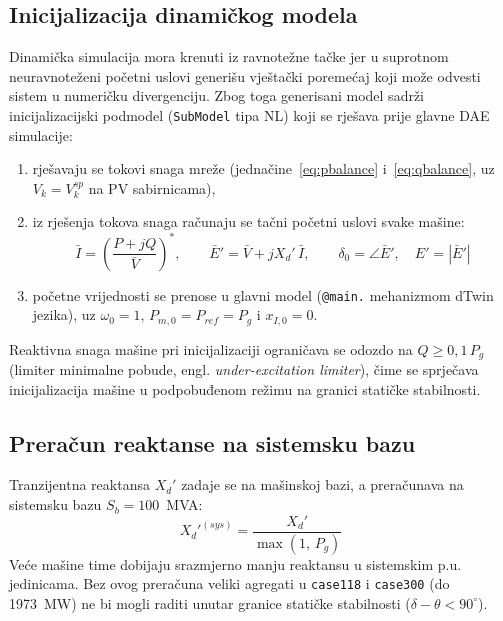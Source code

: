 \documentclass[12pt,oneside, a4paper]{book}
\begin{document}
\subsection{Inicijalizacija dinamičkog modela}
 
Dinamička simulacija mora krenuti iz ravnotežne tačke jer u suprotnom neuravnoteženi početni uslovi generišu vještački poremećaj koji može odvesti sistem u numeričku divergenciju. Zbog toga generisani model sadrži
inicijalizacijski podmodel (\texttt{SubModel} tipa NL) koji se rješava prije
glavne DAE simulacije:
\begin{enumerate}
  \item rješavaju se tokovi snaga mreže (jednačine~\ref{eq:pbalance}
        i~\ref{eq:qbalance}, uz $V_k = V_k^{sp}$ na PV sabirnicama),
  \item iz rješenja tokova snaga računaju se tačni početni uslovi svake
        mašine:
        \begin{equation}
          \bar{I} = \left( \frac{P + jQ}{\bar{V}} \right)^{\!*},
          \qquad
          \bar{E}' = \bar{V} + jX_d'\,\bar{I},
          \qquad
          \delta_0 = \angle \bar{E}', \quad E' = |\bar{E}'|
          \label{eq:init}
        \end{equation}
  \item početne vrijednosti se prenose u glavni model
        (\texttt{@main.} mehanizmom dTwin jezika), uz $\omega_0 = 1$,
        $P_{m,0} = P_{ref} = P_g$ i $x_{I,0} = 0$.
\end{enumerate}
Reaktivna snaga mašine pri inicijalizaciji ograničava se odozdo na
$Q \geq 0{,}1\,P_g$ (limiter minimalne pobude, engl. \emph{under-excitation
limiter}), čime se sprječava inicijalizacija mašine u podpobuđenom režimu na
granici statičke stabilnosti.
 
\subsection{Preračun reaktanse na sistemsku bazu}
 
Tranzijentna reaktansa $X_d'$ zadaje se na mašinskoj bazi, a preračunava na
sistemsku bazu $S_b = 100$~MVA:
\begin{equation}
  X_d'^{(sys)} = \frac{X_d'}{\max(1,\,P_g)}
  \label{eq:xdp}
\end{equation}
Veće mašine time dobijaju srazmjerno manju reaktansu u sistemskim p.u.
jedinicama. Bez ovog preračuna veliki agregati u \texttt{case118} i
\texttt{case300} (do 1973~MW) ne bi mogli raditi unutar granice statičke
stabilnosti ($\delta - \theta < 90^\circ$).
 
\end{document}
